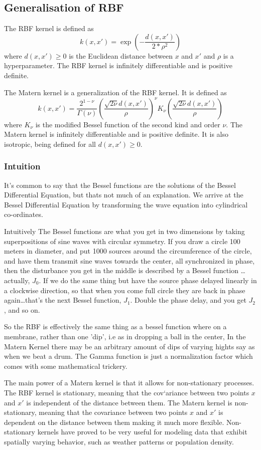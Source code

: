 \documentclass[hidelinks]{book}
\numberwithin{equation}{section}
\begin{document}
\subsection{Generalisation of RBF}
The RBF kernel is defined as
 $$ k(x,x') = \exp\left(-\frac{d(x,x')}{2*\rho^2}\right) $$
where $d(x,x') \geq 0$ is the Euclidean distance between $x$ and $x'$ and
$\rho$ is a hyperparameter. The RBF kernel is infinitely differentiable and
is positive definite.

The Matern kernel is a generalization of the RBF kernel. It is defined as
$$ k(x,x') = \frac{2^{1-\nu}}{\Gamma(\nu)}\left(\frac{\sqrt{2\nu}d(x,x')}{\rho}\right)^\nu K_{\nu}\left(\frac{\sqrt{2\nu}d(x,x')}{\rho}\right) $$
where $K_{\nu}$ is the modified Bessel function of the second kind and
order $\nu$. The Matern kernel is infinitely differentiable and is positive definite.
It is also isotropic, being defined for all $d(x,x') \geq 0$.

\subsubsection{Intuition}
It's common to say that the Bessel functions are the solutions of the Bessel
Differential Equation, but thats not much of an explanation. We arrive at
the Bessel Differential Equation by transforming the wave equation into
cylindrical co-ordinates.

Intuitively The Bessel functions are what you get in two dimensions by taking
superpositions of sine waves with circular symmetry. If you draw a circle 100
meters in diameter, and put 1000 sources around the circumference of the circle,
and have them transmit sine waves towards the center, all synchronized in phase,
then the disturbance you get in the middle is described by a Bessel function
… actually, $J_0$. If we do the same thing but have the source phase delayed
linearly in a clockwise direction, so that when you come full circle they are
back in phase again…that's the next Bessel function, $J_1$. Double the phase
delay, and you get $J_2$, and so on.

So the RBF is effectively the same thing as a bessel function where on a membrane,
rather than one 'dip', i.e as in dropping a ball in the center, In the Matern
Kernel there may be an arbitrary amount of dips of varying hights say as when
we beat a drum. The Gamma function is just a normalization factor which comes
with some mathematical trickery.

The main power of a Matern kernel is that it allows for non-stationary processes.
The RBF kernel is stationary, meaning that the cov`ariance between two points
$x$ and $x'$ is independent of the distance between them. The Matern kernel is
non-stationary, meaning that the covariance between two points $x$ and $x'$ is
dependent on the distance between them making it much more flexible. Non-stationary
kernels have proved to be very useful for modeling data that exhibit spatially
varying behavior, such as weather patterns or population density.
\end{document}
